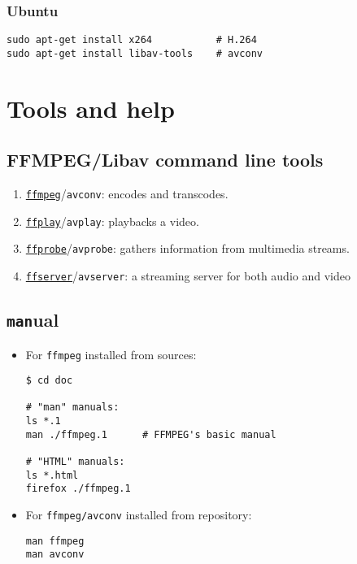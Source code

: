 \subsection{Ubuntu}

\begin{verbatim}
sudo apt-get install x264           # H.264
sudo apt-get install libav-tools    # avconv
\end{verbatim}




\chapter{Tools and help}

\section{FFMPEG/Libav command line tools}

\begin{enumerate}
\item \href{https://www.ffmpeg.org/ffmpeg.html}{\texttt{ffmpeg}}/\texttt{avconv}: encodes and transcodes.
\item \href{https://www.ffmpeg.org/ffplay.html}{\texttt{ffplay}}/\texttt{avplay}: playbacks a video.
\item \href{https://www.ffmpeg.org/ffprobe.html}{\texttt{ffprobe}}/\texttt{avprobe}: gathers information from multimedia streams.
\item \href{https://www.ffmpeg.org/ffserver.html}{\texttt{ffserver}}/\texttt{avserver}: a streaming server for both audio and video
\end{enumerate}


\section{\texttt{man}ual}

\begin{itemize}

\item For \texttt{ffmpeg} installed from sources:

\begin{verbatim}
$ cd doc

# "man" manuals:
ls *.1
man ./ffmpeg.1      # FFMPEG's basic manual

# "HTML" manuals:
ls *.html
firefox ./ffmpeg.1
\end{verbatim}


\item For  \texttt{ffmpeg/avconv} installed from repository:

\begin{verbatim}
man ffmpeg
man avconv
\end{verbatim}


\end{itemize}

